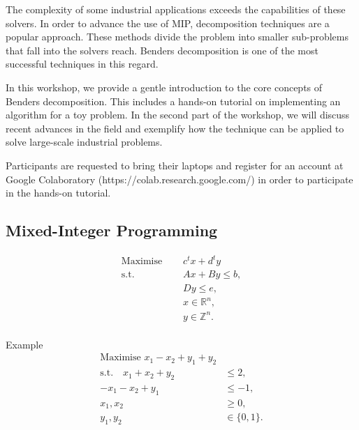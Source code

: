 The complexity of some industrial applications exceeds the capabilities of these solvers. In order to advance the use of MIP, decomposition techniques are a popular approach. These methods divide the problem into smaller sub-problems that fall into the solvers reach. Benders decomposition is one of the most successful techniques in this regard.

In this workshop, we provide a gentle introduction to the core concepts of Benders decomposition. This includes a hands-on tutorial on implementing an algorithm for a toy problem. In the second part of the workshop, we will discuss recent advances in the field and exemplify how the technique can be applied to solve large-scale industrial problems.

Participants are requested to bring their laptops and register for an account at Google Colaboratory (https://colab.research.google.com/) in order to participate in the hands-on tutorial.

\vfill

\newpage





\subsection*{Mixed-Integer Programming}

\vfill

\begin{align*}
\textrm{Maximise } \quad &  c^tx + d^ty \\
\textrm{s.t.} \quad & Ax + By \leq b, \\
& Dy \leq e, \\
& x \in \mathbb{R}^n,\\
& y \in \mathbb{Z}^n.\\
\end{align*}

\vfill

\begin{bclogo}[logo=\bccrayon]{\small Example } \small
\vspace{-0.8cm}
\begin{align*}
\textrm{Maximise }  x_1 - x_2 + y_1 + y_2 & \\
\textrm{s.t.} \quad  x_1  + x_2 + y_2 &\leq 2, \\
 -x_1  - x_2 + y_1 &\leq -1, \\
 x_1, x_2 &\geq 0, \\
 y_1, y_2 &\in \{0,1\}.
\end{align*}
\end{bclogo}

